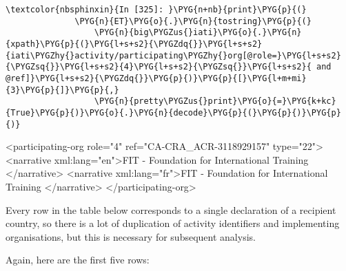 \documentclass[letterpaper,10pt,english]{sphinxmanual}
\begin{document}
\begin{Verbatim}[commandchars=\\\{\}]
\textcolor{nbsphinxin}{In [325]: }\PYG{n+nb}{print}\PYG{p}{(}
              \PYG{n}{ET}\PYG{o}{.}\PYG{n}{tostring}\PYG{p}{(}
                  \PYG{n}{big\PYGZus{}iati}\PYG{o}{.}\PYG{n}{xpath}\PYG{p}{(}\PYG{l+s+s2}{\PYGZdq{}}\PYG{l+s+s2}{iati\PYGZhy{}activity/participating\PYGZhy{}org[@role=}\PYG{l+s+s2}{\PYGZsq{}}\PYG{l+s+s2}{4}\PYG{l+s+s2}{\PYGZsq{}}\PYG{l+s+s2}{ and @ref]}\PYG{l+s+s2}{\PYGZdq{}}\PYG{p}{)}\PYG{p}{[}\PYG{l+m+mi}{3}\PYG{p}{]}\PYG{p}{,}
                  \PYG{n}{pretty\PYGZus{}print}\PYG{o}{=}\PYG{k+kc}{True}\PYG{p}{)}\PYG{o}{.}\PYG{n}{decode}\PYG{p}{(}\PYG{p}{)}\PYG{p}{)}
\end{Verbatim}
%
\begin{OriginalVerbatim}[commandchars=\\\{\}]
<participating-org role="4" ref="CA-CRA\_ACR-3118929157" type="22">
  <narrative xml:lang="en">FIT - Foundation for International Training </narrative>
  <narrative xml:lang="fr">FIT - Foundation for International Training </narrative>
</participating-org>

\end{OriginalVerbatim}
\relax
Every row in the table below corresponds to a single declaration of a
recipient country, so there is a lot of duplication of activity
identifiers and implementing organisations, but this is necessary for
subsequent analysis.

Again, here are the first five rows:
\end{document}
